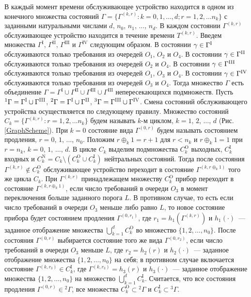 \documentclass[a4paper,12pt,russian]{extarticle}
\newcommand{\G}{\Gamma}
\newcommand{\ga}[1]{\Gamma^{\left( #1 \right)} }
\newcommand{\Tt}[1]{T^{\left( #1 \right)} }
\begin{document}
 В каждый момент времени обслуживающее устройство находится в одном из конечного множества состояний $\Gamma=\{\G^{(k,r)} \colon k=0,1,\ldots,d; r=1,2,\ldots n_k\}$ с заданными натуральными числами $d$, $n_0$, $n_1$, $\ldots$, $n_d$. В каждом состоянии $\ga{k,r}$ обслуживающее устройство находится в течение времени $\Tt{k,r}$. Введем множества $\G^{\mathrm{I}}$, $\G^{\mathrm{II}}$, $\G^{\mathrm{III}}$ и $\G^{\mathrm{IV}}$ следующим образом. В состоянии $\gamma \in \G^{\mathrm{\Rmnum{1}}}$ обслуживаются только требования из очередей $O_1$, $O_2$ и $O_4$.
В состоянии $\gamma \in \G^{\mathrm{\Rmnum{2}}}$ обслуживаются только требования из очередей $O_2$ и $O_4$.
В состоянии $\gamma \in \G^{\mathrm{\Rmnum{3}}}$ обслуживаются только требования из очередей $O_1$, $O_3$ и $O_4$.
В состоянии $\gamma \in \G^{\mathrm{\Rmnum{4}}}$ обслуживаются только требования из очередей $O_3$ и $O_4$.
Тогда множество $\G$ есть объединение $\G = \G^{\mathrm{I}} \cup \G^{\mathrm{II}} \cup \G^{\mathrm{III}} \cup \G^{\mathrm{III}}$ непересекающихся подмножеств. 
Пусть ${}^1\G=\G^{\mathrm{\Rmnum{1}}} \cup \G^{\mathrm{\Rmnum{3}}}$, 
${}^2\G=\G^{\mathrm{\Rmnum{1}}} \cup \G^{\mathrm{\Rmnum{2}}}$,
${}^3\G=\G^{\mathrm{\Rmnum{3}}} \cup \G^{\mathrm{\Rmnum{4}}}$.
Смена состояний обслуживающего устройства осуществляется по следующему правилу. Множество состояний $C_k = \{\G^{(k,r)} \colon r=1,2,\ldots n_k\}$ будем называть $k$-м циклом, $k=1$, $2$, $\ldots$, $d$ (Рис. \ref{GraphScheme}). При $k=0$ состояние вида $\ga{0,r}$ будем называть состоянием продления, $r=0$, $1$, $\ldots$, $n_0$. Положим $r \oplus_k 1 = r+1$ для $r<n_k$ и $r \oplus_k 1 = 1$ при $r=n_k$, $k = 0$, $1$, $\ldots$, $d$. В цикле $C_k$ выделим подмножества $C_k^{\mathrm{O}}$ выходных, $C_k^{\mathrm{I}}$ входных и $C_k^{\mathrm{N}} = C_k \setminus (C_k^{\mathrm{O}} \cup C_k^{\mathrm{I}})$ нейтральных состояний. Тогда после состояния $\ga{k,r} \not\in C_k^{\mathrm{O}}$ обслуживающее устройство переходит в состояние $\ga{k,r \oplus_k 1}$ того же цикла $C_k$. При $\ga{k,r}$ принадлежащем множеству $C_k^{\mathrm{O}}$ прибор переходит в состояние $\ga{k,r\oplus_k 1}$, если число требований в очереди $O_3$ в момент переключения больше заданного порога $L$. В противном случае, то есть если число требований в очереди $O_3$ меньше либо равно $L$, то новое состояние прибора будет состоянием продления $\ga{0,r_1}$, где $r_1=h_1(\ga{k,r})$ и $h_1(\cdot)$~--- заданное отображение множества $\bigcup\limits_{k=1}^d C_k^{\mathrm{O}}$ во множество $\{1,2,\ldots, n_0\}$. После состояния $\ga{0,r}$ выбирается состояние того же вида $\ga{0,r_2}$, если число требований в очереди $O_3$ меньше $L$, где $r_2=h_2(r)$ и $h_2(\cdot)$~--- заданное отображение множества $\{1,2, \ldots, n_0\}$ на себя; в противном случае включается состояние $\ga{k,r_3} \in C_k^{\mathrm{I}}$, где $\ga{k,r_3}=h_3(r)$ и $h_3(\cdot)$~--- заданное отображение множества $\{1,2, \ldots, n_0\}$ на множество  $\bigcup\limits_{k=1}^d C_k^{\mathrm{I}}$. Считается, что все состояния продления $\ga{0,r} \in {}^2 \G$, все множества $C_k^\mathrm{O}\subset {}^2 \G$ и $C_k^\mathrm{I}\subset {}^3 \G$.
\end{document}
